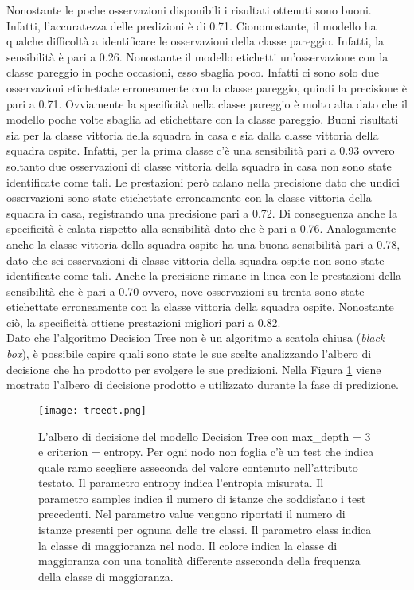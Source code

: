 Nonostante le poche osservazioni disponibili i risultati ottenuti sono buoni. Infatti, l'accuratezza delle predizioni è di 0.71. Ciononostante, il modello ha qualche difficoltà a identificare le osservazioni della classe pareggio. Infatti, la sensibilità è pari a 0.26. Nonostante il modello etichetti un'osservazione con la classe pareggio in poche occasioni, esso sbaglia poco. Infatti ci sono solo due osservazioni etichettate erroneamente con la classe pareggio, quindi la precisione è pari a 0.71. Ovviamente la specificità nella classe pareggio è molto alta dato che il modello poche volte sbaglia ad etichettare con la classe pareggio. Buoni risultati sia per la classe vittoria della squadra in casa e sia dalla classe vittoria della squadra ospite. Infatti, per la prima classe c'è una sensibilità pari a 0.93 ovvero soltanto due osservazioni di classe vittoria della squadra in casa non sono state identificate come tali. Le prestazioni però calano nella precisione dato che undici osservazioni sono state etichettate erroneamente con la classe vittoria della squadra in casa, registrando una precisione pari a 0.72. Di conseguenza anche la specificità è calata rispetto alla sensibilità dato che è pari a 0.76. Analogamente anche la classe vittoria della squadra ospite ha una buona sensibilità pari a 0.78, dato che sei osservazioni di classe vittoria della squadra ospite non sono state identificate come tali. Anche la precisione rimane in linea con le prestazioni della sensibilità che è pari a 0.70 ovvero, nove osservazioni su trenta sono state etichettate erroneamente con la classe vittoria della squadra ospite. Nonostante ciò, la specificità ottiene prestazioni migliori pari a 0.82.\\
Dato che l'algoritmo Decision Tree non è un algoritmo a scatola chiusa (\emph{black box}), è possibile capire quali sono state le sue scelte analizzando l'albero di decisione che ha prodotto per svolgere le sue predizioni. Nella Figura \ref{fig:dttree} viene mostrato l'albero di decisione prodotto e utilizzato durante la fase di predizione.
\begin{figure}[h]
	\begin{center}
		\texttt{[image: treedt.png]}
		\caption{L'albero di decisione del modello Decision Tree con \textsf{max\_dept}h = 3 e \textsf{criterion} = entropy. Per ogni nodo non foglia c'è un test che indica quale ramo scegliere asseconda del valore contenuto nell'attributo testato. Il parametro \textsf{entropy} indica l'entropia misurata. Il parametro \textsf{samples} indica il numero di istanze che soddisfano i test precedenti. Nel parametro \textsf{value} vengono riportati il numero di istanze presenti per ognuna delle tre classi. Il parametro \textsf{class} indica la classe di maggioranza nel nodo. Il colore indica la classe di maggioranza con una tonalità differente asseconda della frequenza della classe di maggioranza.
		} 
		\label{fig:dttree}
	\end{center}
\end{figure}

